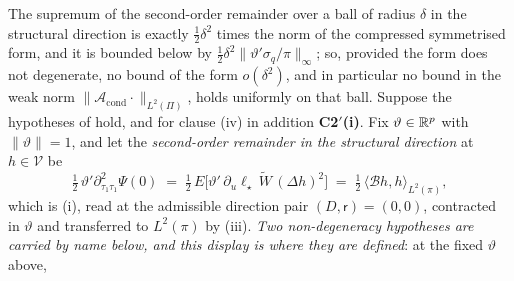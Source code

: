 \begin{proposition}\label{prp:sharpquad}
The supremum of the second-order remainder over a ball of radius $\delta$ in the structural direction is
exactly $\tfrac12\delta^{2}$ times the norm of the compressed symmetrised form, and it is bounded below by
$\tfrac12\delta^{2}\|\vartheta'\sigma_q/\pi\|_\infty$; so, provided the form does not degenerate, no bound
of the form $o(\delta^{2})$, and in particular no bound in the weak norm
$\|\mathcal A_{\mathrm{cond}}\cdot\|_{L^{2}(\Pi)}$, holds uniformly on that ball.
Suppose the hypotheses of  hold, and for clause \textup{(iv)} in addition
\textbf{C2$'$(i)}. Fix $\vartheta\in\mathbb{R}^{p}$ with $\|\vartheta\|=1$,
and let the \emph{second-order remainder in the structural direction} at $h\in\mathcal V$ be
\begin{equation}\label{eq:quadrem}
\tfrac12\,\vartheta'\partial^{2}_{\tau_1\tau_1}\Psi(0)
\;=\;\tfrac12\,E\big[\vartheta'\,\partial_u\ell_\star\,\widetilde W\,(\Delta h)^{2}\big]
\;=\;\tfrac12\,\big\langle\mathcal Bh,h\big\rangle_{L^{2}(\pi)} ,
\end{equation}
which is \textup{(i)}, read at the admissible direction pair
$(D,\mathsf r)=(0,0)$, contracted in $\vartheta$ and transferred to $L^{2}(\pi)$ by
\textup{(iii)}.
\emph{Two non-degeneracy hypotheses are carried by name below, and this display is where they are
defined}: at the fixed $\vartheta$ above,

\end{proposition}
